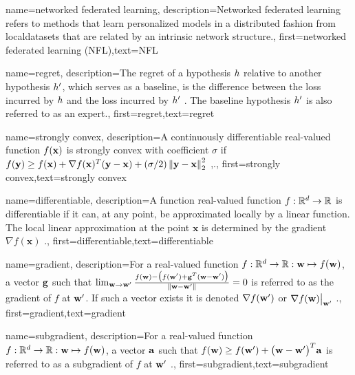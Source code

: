 {name={networked federated learning},
	description={Networked federated learning refers 
		to methods that learn personalized models in a distributed fashion from \gls{localdataset}s 
		that are related by an intrinsic network structure.},
 first={networked federated learning (NFL)},text={NFL} 
}




{name={regret},
	description={The regret of a \gls{hypothesis} $h$ relative to 
		another \gls{hypothesis} $h'$, which serves as a \gls{baseline}, 
		is the difference between the \gls{loss} incurred by $h$ and the \gls{loss} 
		incurred by $h'$ \cite{PredictionLearningGames}. 
		The \gls{baseline} \gls{hypothesis} $h'$ is also referred to as an \gls{expert}.},
	first={regret},text={regret} 
}

{name={strongly convex},
	description={A continuously \gls{differentiable} real-valued 
		function $f({\bf x})$ is strongly convex with coefficient $\sigma$ if $f({\bf y}) \geq f({\bf x}) + \nabla f({\bf x})^{T} ({\bf y} - {\bf x}) + (\sigma/2) \left\Vert {{\bf y}- {\bf x}} \right\Vert_{2}^{2}$ \cite{nesterov04},\cite[Sec. B.1.1.]{CvxAlgBertsekas}.},
	first={strongly convex},text={strongly convex} 
}

{name={differentiable},
	description={A function real-valued function $f: \mathbb{R}^{d} \rightarrow \mathbb{R}$ 
		is differentiable if it can, at any point, be approximated locally by a linear 
		function. The local linear approximation at the point $\mathbf{x}$ is determined 
		by the \gls{gradient} $\nabla f ( \mathbf{x})$ \cite{RudinBookPrinciplesMatheAnalysis}.},
	first={differentiable},text={differentiable} 
}

{name={gradient},
	description={For a real-valued function $f: \mathbb{R}^{d} \rightarrow \mathbb{R}: {\bf w} \mapsto f({\bf w})$, 
	a vector ${\bf g}$ such that $\lim_{{\bf w} \rightarrow {\bf w}'} \frac{f({\bf w}) - \big(f({\bf w}')+ {\bf g}^{T} ({\bf w}- {\bf w}') \big) }{\| {\bf w}-{\bf w}'\|}=0$ 
	is referred to as the gradient of $f$ at ${\bf w}'$. If such a vector exists it is 
	denoted $\nabla f({\bf w}')$ or $\nabla f({\bf w})\big|_{{\bf w}'}$ \cite{RudinBookPrinciplesMatheAnalysis}.},
	first={gradient},text={gradient} 
}

{name={subgradient},
description={For a real-valued function $f: \mathbb{R}^{d} \rightarrow \mathbb{R}: {\bf w} \mapsto f({\bf w})$, 
		a vector ${\bf a}$ such that $f({\bf w}) \geq  f({\bf w}') +\big({\bf w}-{\bf w}' \big)^{T} {\bf a}$ is 
		referred to as a subgradient of $f$ at ${\bf w}'$ \cite{BertCvxAnalOpt,BertsekasNonLinProgr}.},
	first={subgradient},text={subgradient} 
}

